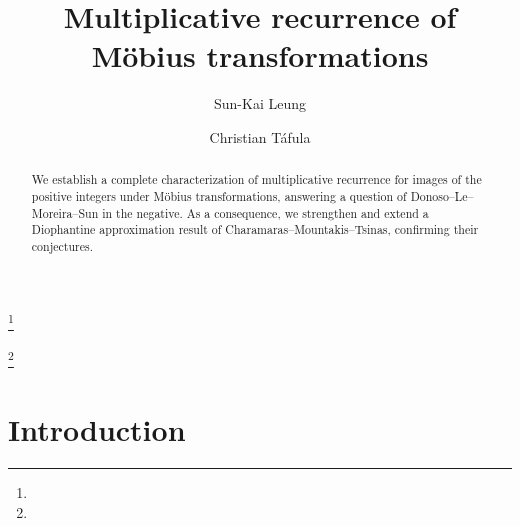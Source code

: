 \documentclass[12pt, reqno, a4paper]{amsart}
\theoremstyle{definition}
\theoremstyle{remark}
\numberwithin{equation}{section}
\begin{document}
\title[Multiplicative recurrence of Möbius transformations]{Multiplicative recurrence of Möbius transformations}



\author{Sun-Kai Leung}
\address{D\'epartement de math\'ematiques et de statistique\\
Universit\'e de Montr\'eal\\
CP 6128 succ. Centre-Ville\\
Montr\'eal, QC H3C 3J7\\
Canada}
\curraddr{}
\thanks{}

\author{Christian T\'afula}
\address{D\'epartement de math\'ematiques et de statistique\\
Universit\'e de Montr\'eal\\
CP 6128 succ. Centre-Ville\\
Montr\'eal, QC H3C 3J7\\
Canada}
\curraddr{}
\thanks{}


\date{}

\dedicatory{}

\keywords{}

\begin{abstract}
We establish a complete characterization of multiplicative recurrence for images of the positive integers under Möbius transformations, answering a question of Donoso–Le–Moreira–Sun in the negative. As a consequence, we strengthen and extend a Diophantine approximation result of Charamaras–Mountakis–Tsinas, confirming their conjectures. %
\end{abstract}

\maketitle

\section{Introduction}
\end{document}
